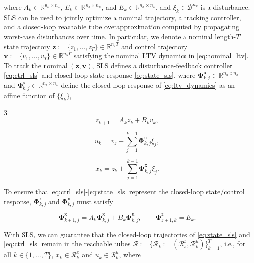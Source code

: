 \documentclass{l4dc2026}
\newcommand{\Px}{\bm{\Phi}^{\mathrm{x}}}
\newcommand{\Pu}{\bm{\Phi}^{\mathrm{u}}}
\begin{document}
\noindent where $A_k\in\mathbb{R}^{n_x \times n_x}$, $B_k\in\mathbb{R}^{n_x \times n_u}$, and $E_k \in \mathbb{R}^{n_x \times n_x}$, and $\xi_k \in \mathcal{B}^{n_x}$ is a disturbance. SLS can be used to jointly optimize a nominal trajectory, a tracking controller, and a closed-loop reachable tube overapproximation computed by propagating worst-case disturbances over time. In particular, we denote a nominal length-$T$ state trajectory $\textbf{z} := \{z_1, \ldots, z_T\} \in \mathbb{R}^{n_x T}$ and control trajectory $\textbf{v} := \{v_1, \ldots, v_T\} \in \mathbb{R}^{n_u T}$ satisfying the nominal LTV dynamics in \eqref{eq:nominal_ltv}. To track the nominal $(\textbf{z}, \textbf{v})$, SLS defines a disturbance-feedback controller \eqref{eq:ctrl_sls} and closed-loop state response \eqref{eq:state_sls}, where $\Pu_{k,j} \in \mathbb{R}^{n_u \times n_x}$ and $\Px_{k,j} \in \mathbb{R}^{n_x \times n_x}$ define the closed-loop response of \eqref{eq:ltv_dynamics} as an affine function of $\{\xi_k\}$,
\vspace{-30pt}
\begin{multicols}{3}
    \begin{equation}\label{eq:nominal_ltv}
    z_{k+1} = A_k z_k + B_k v_k,
\end{equation}

    \begin{equation}\label{eq:ctrl_sls}
    u_k = v_k + \textstyle\sum_{j=1}^{k-1}\Pu_{k,j}\xi_j,
  \end{equation}

  \begin{equation}\label{eq:state_sls}
    x_k = z_k + \textstyle\sum_{j=1}^{k-1}\Px_{k,j}\xi_j.
  \end{equation}
\end{multicols}
\vspace{-5pt}

\noindent To ensure that \eqref{eq:ctrl_sls}-\eqref{eq:state_sls} represent the closed-loop state/control response, $\Px_{k,j}$ and $\Pu_{k,j}$ must satisfy 

\vspace{-8pt}
\begin{equation}\label{eq:sls_affine}
    \Px_{k+1,j} = A_k\Px_{k,j} + B_k\Pu_{k,j},\qquad \Px_{k+1,k} = E_k.
\end{equation}
\vspace{-13pt}

\noindent With SLS, we can guarantee that the closed-loop trajectories of \eqref{eq:state_sls} and \eqref{eq:ctrl_sls} remain in the reachable tubes 
$\mathcal{R} := \{\mathcal{R}_k:= (\mathcal{R}_k^x, \mathcal{R}_k^u)\}_{k=1}^T$, i.e., for all $k \in \{1, \ldots, T\}$, $x_k \in \mathcal{R}_k^x$ and $u_k \in \mathcal{R}_k^u$, where
\end{document}
